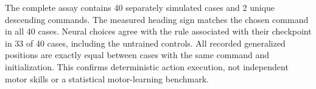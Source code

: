 The complete assay contains 40 separately simulated cases and 2 unique descending commands. The measured heading sign matches the chosen command in all 40 cases. Neural choices agree with the rule associated with their checkpoint in 33 of 40 cases, including the untrained controls. All recorded generalized positions are exactly equal between cases with the same command and initialization. This confirms deterministic action execution, not independent motor skills or a statistical motor-learning benchmark.
